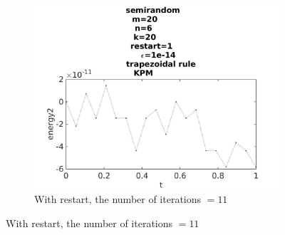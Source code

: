 \begin{figure}[H]
        ~
        \begin{subfigure}[b]{0.3\textwidth}
                \includegraphics[width=\textwidth]{../MATLAB/fig/energyarnrestart1.jpg}
                \caption{ With restart, the number of iterations $ = 11$ }
                \label{fig:energyarnrestart1}
        \end{subfigure}
        

\end{figure}

